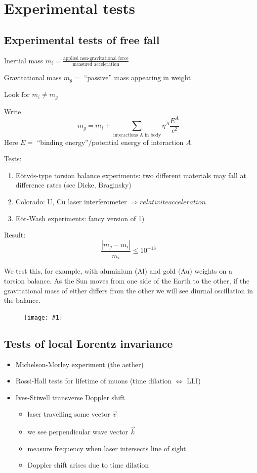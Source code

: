 \documentclass[a4paper]{article} %
\renewcommand{\picture}[1]
{
\begin{figure}[h]
\centering
\texttt{[image: \#1]}
\end{figure}
}
\begin{document}
\section{Experimental tests}
\subsection{Experimental tests of free fall}
Inertial mass $m_i=\frac{\text{applied non-gravitational force}}{\text{measured acceleration}}$

Gravitational mass $m_g=$ ``passive'' mass appearing in weight

Look for $m_i \neq m_g$

Write 
\begin{equation}
m_g=m_i + \sum_{\text{interactions A in body}}\eta^A \frac{E^A}{c^2}
\end{equation} 
Here $E=$ ``binding energy''/potential energy of interaction $A$.

\underline{Tests:}
\begin{enumerate}
\item E{\"o}tv{\"o}s-type torsion balance experiments: two different materials may fall at difference rates (see Dicke, Braginsky)
\item Colorado: U, Cu laser interferometer $\Rightarrow relativite acceleration$
\item E{\"o}t-Wash experiments: fancy version of 1)
\end{enumerate}

Result:
\begin{equation}
\frac{|m_g-m_i|}{m_i}\leq 10^{-13}
\end{equation}

We test this, for example, with aluminium (Al) and gold (Au) weights on a torsion balance. As the Sun moves from one side of the Earth to the other, if the gravitational mass of either differs from the other we will see diurnal oscillation in the balance.

\picture{images/eotvos.png}

\subsection{Tests of local Lorentz invariance}
\begin{itemize}
\item Michelson-Morley experiment (the aether)
\item Rossi-Hall tests for lifetime of muons (time dilation $\Leftrightarrow$ LLI)
\item Ives-Stiwell transverse Doppler shift
\begin{itemize}
\item laser travelling some vector $\vec{v}$
\item we see perpendicular wave vector $\vec{k}$
\item measure frequency when laser intersects line of sight
\item Doppler shift arises due to time dilation
\end{itemize}
\end{itemize}
\end{document}
